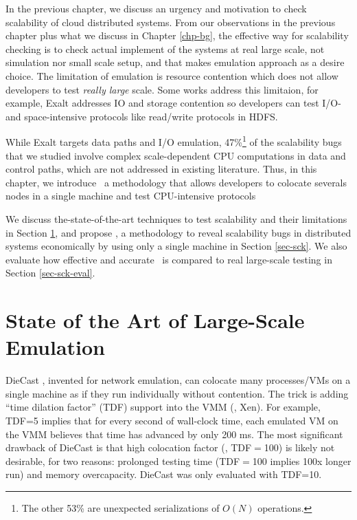 In the previous chapter, we discuss an urgency and motivation to check
scalability of cloud distributed systems. From our observations in the previous
chapter plus what we discuss in Chapter \ref{chp-bg}, the effective way for
scalability checking is to check actual implement of the systems at real large
scale, not simulation nor small scale setup, and that makes emulation approach
as a desire choice. The limitation of emulation is resource contention which
does not allow developers to test \textit{really large} scale. Some works
address this limitaion, for example, Exalt \cite{exalt} addresses IO and storage
contention so developers can test I/O- and space-intensive protocols like
read/write protocols in HDFS.

While Exalt targets data paths and I/O emulation, 47\%\footnote{The other 53\%
are unexpected serializations of $O(N)$ operations.} of the scalability bugs
that we studied involve complex scale-dependent CPU computations in data and
control paths, which are not addressed in existing literature. Thus, in this
chapter, we introduce \sck\, a methodology that allows developers to colocate
severals nodes in a single machine and test CPU-intensive protocols


We discuss the-state-of-the-art techniques to test scalability
and their limitations in Section \ref{mot-state}, and propose \sck, a
methodology to reveal scalability bugs in distributed systems economically by
using only a single machine in Section \ref{sec-sck}. We also evaluate how
effective and accurate \sck\ is compared to real large-scale testing in Section
\ref{sec-sck-eval}.

\section{State of the Art of Large-Scale Emulation}
\label{mot-state}


%
DieCast \cite{Gupta+08-DieCast}, invented for network emulation, can colocate
many processes/VMs on a single machine as if they run individually without
contention.  The trick is adding ``time dilation factor'' (TDF) support
\cite{Gupta+06-TimeDilation} into the VMM (\eg, Xen).
%
For example, TDF=5 implies that for every second of wall-clock time, each
emulated VM on the VMM believes that time has advanced by only 200 ms.
%
The most significant drawback of DieCast is that high colocation factor (\eg,
TDF$=$100) is likely not desirable, for two reasons: prolonged testing time
(TDF$=$100 implies 100x longer run) and memory overcapacity.  DieCast was only
evaluated with TDF=10.


